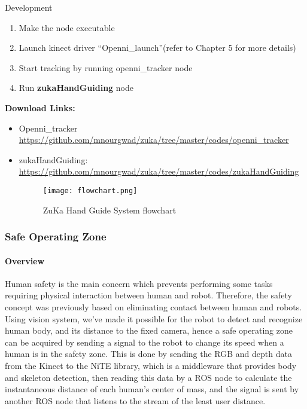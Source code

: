 \documentclass[a4paper]{book}
\begin{document}
\begin{chapter}{Development}
\begin{enumerate}
\begin{enumerate}
		\item Make the node executable
		\item Launch kinect driver “Openni\_launch”(refer to Chapter 5 for more details)
		\item Start tracking by running openni\_tracker node
		\item Run \textbf{zukaHandGuiding} node
		
	\end{enumerate}
	
\end{enumerate}

\textbf{Download Links:}
\begin{itemize}
	\item Openni\_tracker \newline \url{
		https://github.com/mnourgwad/zuka/tree/master/codes/openni_tracker }
	
	\item	zukaHandGuiding: \newline \url{
		https://github.com/mnourgwad/zuka/tree/master/codes/zukaHandGuiding }
	\begin{figure}[H]
		\centering
		\caption{ZuKa Hand Guide System flowchart}
		\texttt{[image: flowchart.png]}
	\end{figure} 
\end{itemize}

\newpage
\subsubsection{Safe Operating Zone}
\paragraph{Overview}
Human safety is the main concern which prevents performing some tasks requiring physical interaction between human and robot. Therefore, the safety concept was previously based on eliminating contact between human and robots.
Using vision system, we’ve made it possible for the robot to detect and recognize human body, and its distance to the fixed camera, hence a safe operating zone can be acquired by sending a signal to the robot to change its speed when a human is in the safety zone.
This is done by sending the RGB and depth data from the Kinect to the NiTE library, which is a middleware that provides body and skeleton detection, then reading this data by a ROS node to calculate the instantaneous distance of each human’s center of mass, and the signal is sent by another ROS node that listens to the stream of the least user distance.



\end{chapter}
\end{document}

